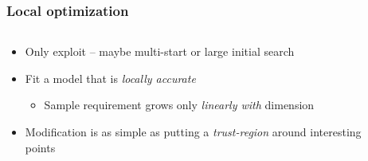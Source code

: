 \documentclass[aspectratio=169]{beamer}
\begin{document}
\begin{frame}
\frametitle{Local optimization}

\begin{columns}
\begin{column}{0.5\textwidth}
\begin{itemize}
\item Only exploit -- maybe multi-start or large initial search
\item Fit a model that is {\sl locally accurate}
\begin{itemize}
\item Sample requirement grows only {\sl linearly with} dimension
\end{itemize}
\item Modification is as simple as putting a {\sl trust-region} around interesting points
\end{itemize}
\end{column}
\begin{column}{0.5\textwidth}



\end{column}
\end{columns}

\end{frame}
\end{document}
